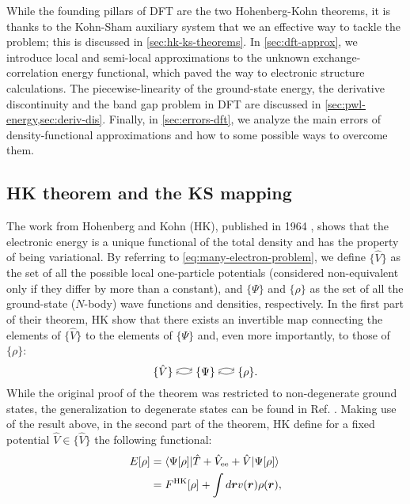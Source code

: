 While the founding pillars of DFT are the two Hohenberg-Kohn theorems, it is thanks to the Kohn-Sham auxiliary system that we an effective way to tackle the problem; this is discussed in \cref{sec:hk-ks-theorems}. In \cref{sec:dft-approx}, we introduce local and semi-local approximations to the unknown exchange-correlation energy functional, which paved the way to electronic structure calculations. The piecewise-linearity of the ground-state energy, the derivative discontinuity and the band gap problem in DFT are discussed in \cref{sec:pwl-energy,sec:deriv-dis}. Finally, in \cref{sec:errors-dft}, we analyze the main errors of density-functional approximations and how to some possible ways to overcome them.

\subsection{HK theorem and the KS mapping\label{sec:hk-ks-theorems}}
The work from Hohenberg and Kohn (HK), published in 1964 \cite{hohenberg_inhomogeneous_1964}, shows that the electronic energy is a unique functional of the total density and has the property of being variational. By referring to \cref{eq:many-electron-problem}, we define $\{ \hat{V} \}$ as the set of all the possible local one-particle potentials (considered non-equivalent only if they differ by more than a constant), and $\{ \Psi \}$ and $\{ \rho \}$ as the set of all the ground-state ($N$-body) wave functions and densities, respectively. In the first part of their theorem, HK show that there exists an invertible map connecting the elements of $\{ \hat{V} \}$ to the elements of $\{ \Psi \}$ and, even more importantly, to those of $\{ \rho \}$:
%
\begin{equation}
    \{ \hat{V} \} \curvedrightleft \{ \Psi \} \curvedrightleft \{ \rho \} .
    \label{eq:hk-theorem}
\end{equation}
%
While the original proof of the theorem was restricted to non-degenerate ground states, the generalization to degenerate states can be found in Ref. \cite{dreizler_density_1990}. Making use of the result above, in the second part of the theorem, HK define for a fixed potential $\hat{V} \in \{ \hat{V} \}$ the following functional:
%
\begin{equation}
\begin{split}
    E[\rho] &= \braket{\Psi[\rho]|\hat{T} + \hat{V}_{\rm ee} + \hat{V}|\Psi[\rho]} \\
    &= F^{\rm HK}[\rho] + \int d{\bm r} v({\bm r}) \rho({\bm r}) ,
\end{split}
\label{eq:hk-functional}
\end{equation}
